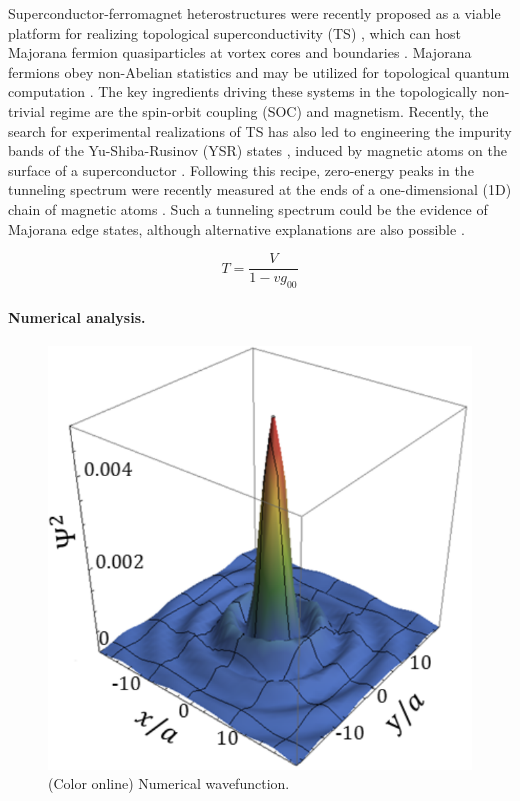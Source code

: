 \documentclass[twocolumn,showpacs,floatfix,nofootinbib,longbibliography]{revtex4-1}
\begin{document}
Superconductor-ferromagnet heterostructures were recently proposed as a viable platform for realizing topological superconductivity (TS) \cite{Lutchyn2010,Oreg2010, Sau2010}, which can host Majorana fermion quasiparticles at vortex cores and boundaries \cite{Kitaev2001, Alicea, Beenakker2013}. Majorana fermions obey non-Abelian statistics and may be utilized for topological quantum computation \cite{Read2000, Ivanov2001, Nayak2008}.  The key ingredients driving these systems in the topologically non-trivial regime are the spin-orbit coupling (SOC) and magnetism. Recently, the search for experimental realizations of TS has also led to engineering the impurity bands of the Yu-Shiba-Rusinov (YSR) states \cite{Yu,Shiba,Rusinov}, induced by magnetic atoms on the surface of a superconductor \cite{Choy2011, Nadj-Perge2013, Klinovaja2013, Vazifeh2013, Braunecker2013, Pientka2013, Nakosai2013, Poyhonen2014, Reis2014, Brydon2015, Rontynen2014, Li2015}. Following this recipe, zero-energy peaks in the tunneling spectrum were recently measured at the ends of a one-dimensional (1D) chain of magnetic atoms \cite{Yazdani2014}. Such a tunneling spectrum could be the evidence of Majorana edge states, although alternative explanations are also possible \cite{Sau2015}.




\begin{equation}
 T = \frac{V}{1-vg_{00}}
\end{equation}

\paragraph*{Numerical analysis.} \label{sec:numerics}

\begin{figure} \centering
\includegraphics[width=0.7\linewidth]{WaveFunction}
\caption{(Color online) Numerical wavefunction. } \label{fig:wavefunction}
\end{figure}
\end{document}
